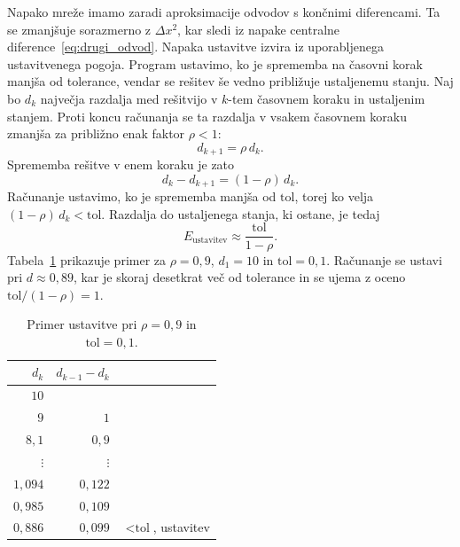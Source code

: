 \documentclass[a4paper,11pt]{article}
\begin{document}
	Napako mreže imamo zaradi aproksimacije odvodov s končnimi diferencami. Ta se zmanjšuje sorazmerno z $\Delta x^2$, kar sledi iz napake centralne diference~\eqref{eq:drugi_odvod}. Napaka ustavitve izvira iz uporabljenega ustavitvenega pogoja. Program ustavimo, ko je sprememba na časovni korak manjša od tolerance, vendar se rešitev še vedno približuje ustaljenemu stanju. Naj bo $d_k$ največja razdalja med rešitvijo v $k$-tem časovnem koraku in ustaljenim stanjem. Proti koncu računanja se ta razdalja v vsakem časovnem koraku zmanjša za približno enak faktor $\rho < 1$:
	\begin{equation}
		d_{k+1} = \rho\, d_k.
	\end{equation}
	Sprememba rešitve v enem koraku je zato
	\begin{equation}
		d_k - d_{k+1} = (1 - \rho)\, d_k.
	\end{equation}
	Računanje ustavimo, ko je sprememba manjša od $\text{tol}$, torej ko velja $(1-\rho)\,d_k < \text{tol}$. Razdalja do ustaljenega stanja, ki ostane, je tedaj
	\begin{equation}
		E_{\text{ustavitev}} \approx \frac{\text{tol}}{1 - \rho}.
		\label{eq:ustavitev_napaka}
	\end{equation}
	Tabela~\ref{tab:primer_ustavitev} prikazuje primer za $\rho = 0{,}9$, $d_1 = 10$ in $\text{tol} = 0{,}1$. Računanje se ustavi pri $d \approx 0{,}89$, kar je skoraj desetkrat več od tolerance in se ujema z oceno $\text{tol}/(1-\rho) = 1$.
	
	\begin{table}[htbp]
		\centering
		\begin{tabular}{rrl}
			\toprule
			$d_k$     & $d_{k-1} - d_k$ & \\
			\midrule
			$10$      &                  & \\
			$9$       & $1$              & \\
			$8{,}1$   & $0{,}9$          & \\
			$\vdots$  & $\vdots$         & \\
			$1{,}094$ & $0{,}122$        & \\
			$0{,}985$ & $0{,}109$        & \\
			$0{,}886$ & $0{,}099$        & $< \text{tol}$, ustavitev \\
			\bottomrule
		\end{tabular}
		\caption{Primer ustavitve pri $\rho = 0{,}9$ in $\text{tol} = 0{,}1$.}
		\label{tab:primer_ustavitev}
	\end{table}
	
\end{document}
